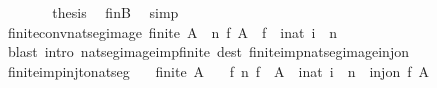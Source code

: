 \begin{isabellebody}
\ \ \ \ \isamarkupfalse%
\ \isamarkupfalse%
\ {\isacharquery}{\kern0pt}thesis\ \isamarkupfalse%
\ finB\ \isamarkupfalse%
\ simp\isanewline
\ \ \isamarkupfalse%
\isanewline
{}\isamarkupfalse%
%
\endisatagproof
{\isafoldproof}%
%
\isadelimproof
\isanewline
%
\endisadelimproof
\isanewline
{}\isamarkupfalse%
\ finite{\isacharunderscore}{\kern0pt}conv{\isacharunderscore}{\kern0pt}nat{\isacharunderscore}{\kern0pt}seg{\isacharunderscore}{\kern0pt}image{\isacharcolon}{\kern0pt}\ {\isachardoublequoteopen}finite\ A\ {\isasymlongleftrightarrow}\ {\isacharparenleft}{\kern0pt}{\isasymexists}n\ f{\isachardot}{\kern0pt}\ A\ {\isacharequal}{\kern0pt}\ f\ {\isacharbackquote}{\kern0pt}\ {\isacharbraceleft}{\kern0pt}i{\isacharcolon}{\kern0pt}{\isacharcolon}{\kern0pt}nat{\isachardot}{\kern0pt}\ i\ {\isacharless}{\kern0pt}\ n{\isacharbraceright}{\kern0pt}{\isacharparenright}{\kern0pt}{\isachardoublequoteclose}\isanewline
%
\isadelimproof
\ \ %
\endisadelimproof
%
\isatagproof
{}\isamarkupfalse%
\ {\isacharparenleft}{\kern0pt}blast\ intro{\isacharcolon}{\kern0pt}\ nat{\isacharunderscore}{\kern0pt}seg{\isacharunderscore}{\kern0pt}image{\isacharunderscore}{\kern0pt}imp{\isacharunderscore}{\kern0pt}finite\ dest{\isacharcolon}{\kern0pt}\ finite{\isacharunderscore}{\kern0pt}imp{\isacharunderscore}{\kern0pt}nat{\isacharunderscore}{\kern0pt}seg{\isacharunderscore}{\kern0pt}image{\isacharunderscore}{\kern0pt}inj{\isacharunderscore}{\kern0pt}on{\isacharparenright}{\kern0pt}%
\endisatagproof
{\isafoldproof}%
%
\isadelimproof
\isanewline
%
\endisadelimproof
\isanewline
{}\isamarkupfalse%
\ finite{\isacharunderscore}{\kern0pt}imp{\isacharunderscore}{\kern0pt}inj{\isacharunderscore}{\kern0pt}to{\isacharunderscore}{\kern0pt}nat{\isacharunderscore}{\kern0pt}seg{\isacharcolon}{\kern0pt}\isanewline
\ \ \ {\isachardoublequoteopen}finite\ A{\isachardoublequoteclose}\isanewline
\ \ \ {\isachardoublequoteopen}{\isasymexists}f\ n{\isachardot}{\kern0pt}\ f\ {\isacharbackquote}{\kern0pt}\ A\ {\isacharequal}{\kern0pt}\ {\isacharbraceleft}{\kern0pt}i{\isacharcolon}{\kern0pt}{\isacharcolon}{\kern0pt}nat{\isachardot}{\kern0pt}\ i\ {\isacharless}{\kern0pt}\ n{\isacharbraceright}{\kern0pt}\ {\isasymand}\ inj{\isacharunderscore}{\kern0pt}on\ f\ A{\isachardoublequoteclose}\isanewline
%
\isadelimproof
%
\endisadelimproof
%
\isatagproof
{}\isamarkupfalse%
\ {\isacharminus}{\kern0pt}\isanewline
\ \ \isamarkupfalse%

\end{isabellebody}
